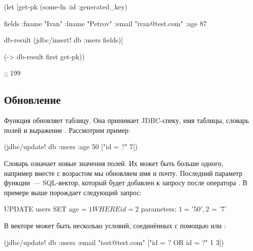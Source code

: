 \begin{english}
  \begin{clojure}
(let [get-pk
      (some-fn :id :generated_key)

      fields
      {:fname "Ivan"
       :lname "Petrov"
       :email "ivan@test.com"
       :age 87}

      db-result
      (jdbc/insert! db :users fields)]

  (-> db-result first get-pk))

;; 199
  \end{clojure}
\end{english}

\subsection{Обновление}


Функция  обновляет таблицу. Она принимает JDBC-спеку, имя таблицы, словарь полей и выражение . Рассмотрим пример:

\begin{english}
  \begin{clojure}
(jdbc/update! db :users {:age 50} ["id = ?" 7])
  \end{clojure}
\end{english}

Словарь  означает новые значения полей. Их может быть больше одного, например вместе с возрастом мы обновляем имя и почту. Последний параметр функции~--- SQL-вектор, который будет добавлен к запросу после оператора . В примере выше  порождает следующий запрос:

\begin{english}
  \begin{sql}
UPDATE users SET age = $1 WHERE id = $2
parameters: $1 = '50', $2 = '7'
  \end{sql}
\end{english}

В векторе может быть несколько условий, соединённых с помощью  или :


\begin{english}
  \begin{clojure}
(jdbc/update! db :users
              {:email "test@test.com"}
              ["id = ? OR id = ?" 1 3])
  \end{clojure}
\end{english}

